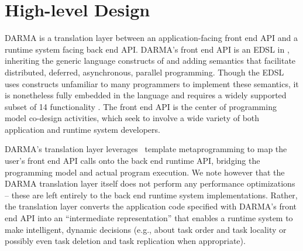 \section{High-level Design}
\gls{DARMA} is a translation layer between an 
application-facing \gls{front end} \gls{API} and a \gls{runtime system} facing \gls{back end} 
\gls{API}. 
\gls{DARMA}'s \gls{front end} \gls{API} 
is an \gls{EDSL} in \CC,  inheriting the generic
language constructs of \CC and adding \gls{semantics} that facilitate
distributed, deferred, asynchronous, parallel programming. Though the \gls{EDSL} uses
\CC constructs unfamiliar to many programmers to implement these semantics, 
it is nonetheless fully embedded in the \CC language and
requires a widely supported subset of \CC{}14 functionality \compilerReqs.
The \gls{front end} \gls{API} is the center of \gls{programming model}
\gls{co-design} activities, which seek to involve a wide variety of both
application and \gls{runtime system} developers. 


\gls{DARMA}'s \gls{translation layer} leverages \CC\ \gls{template
metaprogramming} to map the user's \gls{front end} \gls{API} calls onto the \gls{back end} runtime \gls{API},
bridging the \gls{programming model} and actual program execution.
We note however that the \gls{DARMA} \gls{translation layer} itself does not
perform any performance optimizations -- these are left entirely to the \gls{back end} \gls{runtime system} implementations.
Rather, the translation layer converts the application code specified with
\gls{DARMA}'s \gls{front end} \gls{API} into
an ``intermediate representation'' that enables a \gls{runtime system} to make
intelligent, dynamic decisions (e.g., 
about task order and task locality or possibly even task deletion and task
replication when appropriate).

